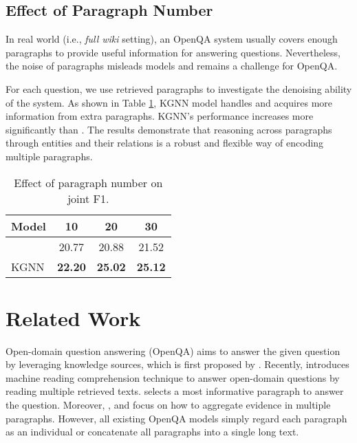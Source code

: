 \documentclass[11pt,a4paper]{article}
\newcommand\OurModel{KGNN\xspace}
\begin{document}
\subsection{Effect of Paragraph Number}

In real world (i.e., \emph{full wiki} setting), an OpenQA system usually covers enough paragraphs to provide useful information for answering questions. Nevertheless, the noise of paragraphs misleads models and remains a challenge for OpenQA.







For each question, we use  retrieved paragraphs to investigate the denoising ability of the system. As shown in Table \ref{tab:paragraph_num}, \OurModel model handles and acquires more information from extra paragraphs. \OurModel's performance increases more significantly than \citet{yang2018hotpotqa}. The results demonstrate that reasoning across paragraphs through entities and their relations is a robust and flexible way of encoding multiple paragraphs.


\begin{table}[t]
\centering
\small
\begin{tabular}{l |c| c | c}
\toprule
Model & 10  & 20& 30\\
\midrule
\citet{yang2018hotpotqa}  & 20.77& 20.88 &21.52\\
KGNN & \textbf{22.20} &  \textbf{25.02} & \textbf{25.12}\\
\bottomrule
\end{tabular}
\caption{Effect of paragraph number on joint F1.}
\label{tab:paragraph_num}
\end{table}

\section{Related Work}
\label{sec:related_work}
Open-domain question answering (OpenQA) aims to answer the given question by leveraging knowledge sources, which is first proposed by \citet{green1961baseball}. Recently, \citet{chen-EtAl:2017:Long4} introduces machine reading comprehension technique to answer open-domain questions by reading multiple retrieved texts. \citet{wang2018r3} selects a most informative paragraph to answer the question. Moreover, \citet{wang2017evidence}, \citet{lin2018denoising} and \citet{clark2017simple} focus on how to aggregate evidence in multiple paragraphs. However, all existing OpenQA models simply regard each paragraph as an individual or concatenate all paragraphs into a single long text.
\end{document}

